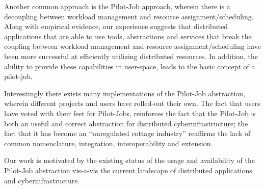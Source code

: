 \documentclass[conference,final]{IEEEtran}
\newcommand{\jhanote}[1]{ {\textcolor{red} { ***shantenu: #1 }}}
\newcommand{\jhanote}[1]{}
\begin{document}
Another common approach is the Pilot-Job approach, wherein there is a
decoupling between workload management and resource
assignment/scheduling.  Along with empirical evidence, our experience
suggests that distributed applications that are able to use tools,
abstractions and services that break the coupling between workload
management and resource assignment/scheduling have been more
successful at efficiently utilizing distributed resources.  In
addition, the ability to provide these capabilities in user-space, leads
to the basic concept of a pilot-job.


Interestingly there exists many implementations of the Pilot-Job
abstraction, wherein different projects and users have rolled-out
their own. The fact that users have voted with their feet for
Pilot-Jobs, reinforces the fact that the Pilot-Job is both an useful
and correct abstraction for distributed cyberinfrastructure; the fact
that it has become an ``unregulated cottage industry'' reaffirms the
lack of common nomenclature, integration, interoperability and
extension.

Our work is motivated by the existing status of the usage and
availability of the Pilot-Job abstraction vis-a-vis the current
landscape of distributed applications and cyberinfrastructure.





\end{document}
